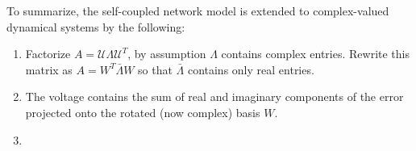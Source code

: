 To summarize, the self-coupled network model is extended to complex-valued dynamical systems by the following:
\begin{enumerate}
	\item Factorize $A = \mathcal{U}\Lambda\mathcal{U}^T$, by assumption $\Lambda$ contains complex entries. Rewrite this matrix as $A = W^T \bar{\Lambda} W$ so that $\bar{\Lambda}$ contains only real entries.
	
	\item The voltage contains the sum of real and imaginary components of the error projected onto the rotated (now complex) basis $W$. 
	
	\item 
\end{enumerate}



